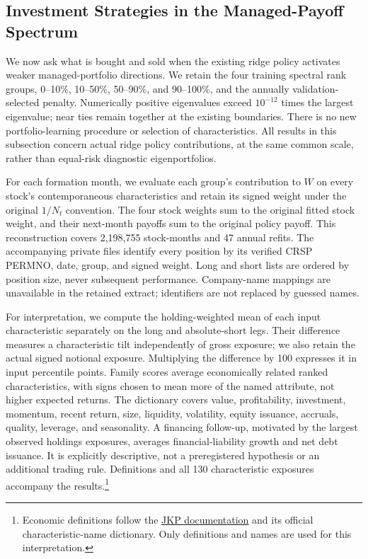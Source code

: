 \subsection{Investment Strategies in the Managed-Payoff Spectrum}

We now ask what is bought and sold when the existing ridge policy activates weaker managed-portfolio directions. We retain the four training spectral rank groups, 0--10\%, 10--50\%, 50--90\%, and 90--100\%, and the annually validation-selected penalty. Numerically positive eigenvalues exceed $10^{-12}$ times the largest eigenvalue; near ties remain together at the existing boundaries. There is no new portfolio-learning procedure or selection of characteristics. All results in this subsection concern actual ridge policy contributions, at the same common scale, rather than equal-risk diagnostic eigenportfolios.

For each formation month, we evaluate each group's contribution to $W$ on every stock's contemporaneous characteristics and retain its signed weight under the original $1/N_t$ convention. The four stock weights sum to the original fitted stock weight, and their next-month payoffs sum to the original policy payoff. This reconstruction covers 2,198,755 stock-months and 47 annual refits. The accompanying private files identify every position by its verified CRSP PERMNO, date, group, and signed weight. Long and short lists are ordered by position size, never subsequent performance. Company-name mappings are unavailable in the retained extract; identifiers are not replaced by guessed names.

For interpretation, we compute the holding-weighted mean of each input characteristic separately on the long and absolute-short legs. Their difference measures a characteristic tilt independently of gross exposure; we also retain the actual signed notional exposure. Multiplying the difference by 100 expresses it in input percentile points. Family scores average economically related ranked characteristics, with signs chosen to mean more of the named attribute, not higher expected returns. The dictionary covers value, profitability, investment, momentum, recent return, size, liquidity, volatility, equity issuance, accruals, quality, leverage, and seasonality. A financing follow-up, motivated by the largest observed holdings exposures, averages financial-liability growth and net debt issuance. It is explicitly descriptive, not a preregistered hypothesis or an additional trading rule. Definitions and all 130 characteristic exposures accompany the results.\footnote{Economic definitions follow the \href{https://jkpfactors-data.s3.amazonaws.com/documents/Documentation.pdf}{JKP documentation} and its official characteristic-name dictionary. Only definitions and names are used for this interpretation.}

